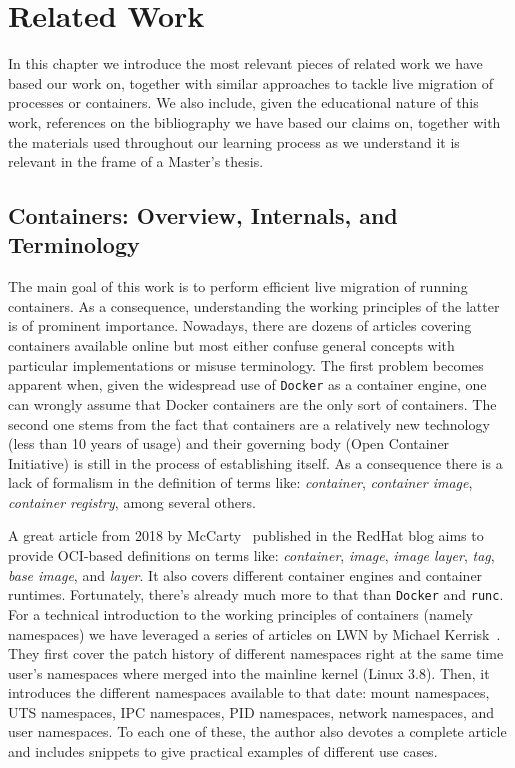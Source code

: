 \chapter{Related Work} \label{chap:related-work}

In this chapter we introduce the most relevant pieces of related work we have based our work on, together with similar approaches to tackle live migration of processes or containers.
We also include, given the educational nature of this work, references on the bibliography we have based our claims on, together with the materials used throughout our learning process as we understand it is relevant in the frame of a Master's thesis.

\section{Containers: Overview, Internals, and Terminology} \label{sec:rw-cont}

The main goal of this work is to perform efficient live migration of running containers.
As a consequence, understanding the working principles of the latter is of prominent importance.
Nowadays, there are dozens of articles covering containers available online but most either confuse general concepts with particular implementations or misuse terminology.
The first problem becomes apparent when, given the widespread use of \texttt{Docker} as a container engine, one can wrongly assume that Docker containers are the only sort of containers.
The second one stems from the fact that containers are a relatively new technology (less than 10 years of usage) and their governing body (Open Container Initiative) is still in the process of establishing itself.
As a consequence there is a lack of formalism in the definition of terms like: \textit{container}, \textit{container image}, \textit{container registry}, among several others.

A great article from 2018 by McCarty~\cite{McCarty2018} published in the RedHat blog aims to provide OCI-based definitions on terms like: \textit{container}, \textit{image}, \textit{image layer}, \textit{tag}, \textit{base image}, and \textit{layer}.
It also covers different container engines and container runtimes.
Fortunately, there's already much more to that than \texttt{Docker} and \texttt{runc}.
For a technical introduction to the working principles of containers (namely namespaces) we have leveraged a series of articles on LWN by Michael Kerrisk~\cite{Kerrisk2013}.
They first cover the patch history of different namespaces right at the same time user's namespaces where merged into the mainline kernel (Linux 3.8).
Then, it introduces the different namespaces available to that date: mount namespaces, UTS namespaces, IPC namespaces, PID namespaces, network namespaces, and user namespaces.
To each one of these, the author also devotes a complete article and includes snippets to give practical examples of different use cases.

